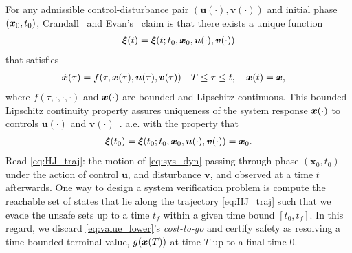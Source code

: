 For any admissible control-disturbance pair $(\bm{u}(\cdot), \bm{v}(\cdot))$ and initial phase $(\bm{x}_0, t_0)$, Crandall~\cite{Crandall1983viscosity} and Evan's~\cite{Evans1984} claim is that there exists a unique function %
%
\begin{align}
	\bm{\xi}(t) = \bm{\xi}(t; t_0, \bm{x}_0, \bm{u}(\cdot), \bm{v}(\cdot))
	\label{eq:HJ_traj}
\end{align}
%
that satisfies 
%
\begin{subequations}
	\begin{align}
		\dot{\bm{x}}(\tau) &= f(\tau, \bm{x}(\tau), \bm{u}(\tau), \bm{v}(\tau)) \quad T \le \tau \le t, \quad \bm{x}(t) = \bm{x},
	\end{align}
	\label{eq:sys_dyn}
\end{subequations}
%
\noindent where $f(\tau, \cdot, \cdot, \cdot)$ and $\bm{x}(\cdot)$ are bounded and Lipschitz continuous. This bounded Lipschitz continuity property assures uniqueness of the system response $\bm{x}(\cdot)$ to controls $\bm{u}(\cdot)$ and $\bm{v}(\cdot)$~\cite{Souganidis}. 
%
a.e. with the property that
%
\begin{align}
	\bm{\xi}(t_0) = \bm{\xi}(t_0; t_0, \bm{x}_0, \bm{u}(\cdot), \bm{v}(\cdot)) = \bm{x}_0.
\end{align}
%
Read \eqref{eq:HJ_traj}: the motion of \eqref{eq:sys_dyn} passing through phase $(\bm{x}_0, t_0)$ under the action of control $\bm{u}$, and disturbance $\bm{v}$, and observed at a time $t$ afterwards. One way to design a system verification problem is compute the reachable set of states that lie along the trajectory \eqref{eq:HJ_traj} such that we evade the unsafe sets up to a time \eg $t_f$ within a given time bound  $\left[t_0, t_f\right]$. In this regard, we discard \eqref{eq:value_lower}'s \textit{cost-to-go} and certify safety as resolving a time-bounded terminal value, $g(\bm{x}(T))$ at time $T$ up to a final time \eg $0$.

